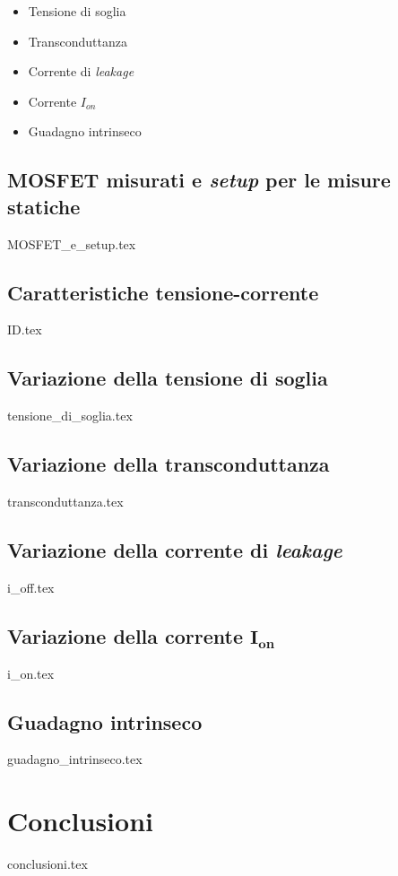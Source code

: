 \documentclass[
	a4paper,
	cleardoublepage=empty,
	headings=twolinechapter,
	numbers=autoenddot,
]{scrbook}
\begin{document}
\begin{itemize}
  \item Tensione di soglia
  \item Transconduttanza
  \item Corrente di \emph{leakage}
  \item Corrente $I_{on}$
  \item Guadagno intrinseco
\end{itemize}

\section{MOSFET misurati e \emph{setup} per le misure statiche}
{MOSFET_e_setup.tex}
\FloatBarrier

\section{Caratteristiche tensione-corrente}
{ID.tex}
\FloatBarrier

\section{Variazione della tensione di soglia}
\label{cap2:vth}
{tensione_di_soglia.tex}

\section{Variazione della transconduttanza}\label{sec:transconduttanza}
{transconduttanza.tex}

\section{Variazione della corrente di \emph{leakage}}
{i_off.tex}

\section[Variazione della corrente $I_{on}$]{Variazione della corrente $\bm{I_{on}}$}
{i_on.tex}

\section{Guadagno intrinseco}
{guadagno_intrinseco.tex}


\chapter*{Conclusioni}
{conclusioni.tex}

\backmatter




\end{document}
